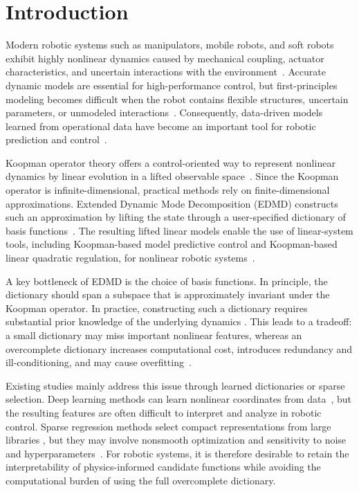 \section{Introduction}
Modern robotic systems such as manipulators, mobile robots,
and soft robots exhibit highly nonlinear dynamics caused by mechanical
coupling, actuator characteristics, and uncertain interactions with the
environment~\cite{Brunton2022,DellaSantina2023}. Accurate dynamic models are
essential for high-performance control, but first-principles modeling becomes
difficult when the robot contains flexible structures, uncertain parameters, or
unmodeled interactions~\cite{Mamakoukas2021TRO}. Consequently,
data-driven models learned from operational data have become an important tool
for robotic prediction and control~\cite{Brunke2022,Tang2025survey,LiSu2026TCST,LiEtAl2026TCYB}.

Koopman operator theory offers a control-oriented way to
represent nonlinear dynamics by linear evolution in a lifted observable
space~\cite{Koopman1931,Korda2018conv}. Since the Koopman operator is
infinite-dimensional, practical methods rely on finite-dimensional
approximations. Extended Dynamic Mode Decomposition (EDMD) constructs such an
approximation by lifting the state through a user-specified dictionary of basis
functions~\cite{Williams2015EDMD,Korda2018conv}. The resulting lifted linear
models enable the use of linear-system tools, including Koopman-based model
predictive control and Koopman-based linear quadratic regulation, for nonlinear
robotic systems~\cite{Proctor2016DMDc,Korda2018MPC,Brunton2016Koopman}.

A key bottleneck of EDMD is the choice of basis functions.
In principle, the dictionary should span a subspace that is approximately
invariant under the Koopman operator. In practice, constructing such a
dictionary requires substantial prior knowledge of the underlying dynamics
\cite{Mauroy2019}. This leads to a tradeoff: a small dictionary may miss
important nonlinear features, whereas an overcomplete dictionary increases
computational cost, introduces redundancy and ill-conditioning, and may cause
overfitting~\cite{Mamakoukas2021TRO,ShiKarydis2022RAL}.

Existing studies mainly address this issue through learned dictionaries or
sparse selection. Deep learning methods can learn nonlinear coordinates from
data~\cite{Lusch2018,ShiMeng2022RAL,Ren2023TMech}, but the resulting features
are often difficult to interpret and analyze in robotic control. Sparse
regression methods select compact representations from large libraries
\cite{Li2017,Zhang2022Automatica}, but they may involve nonsmooth optimization
and sensitivity to noise and hyperparameters~\cite{WangEtAl2023RAL}. For robotic
systems, it is therefore desirable to retain the interpretability of
physics-informed candidate functions while avoiding the computational burden of
using the full overcomplete dictionary.

